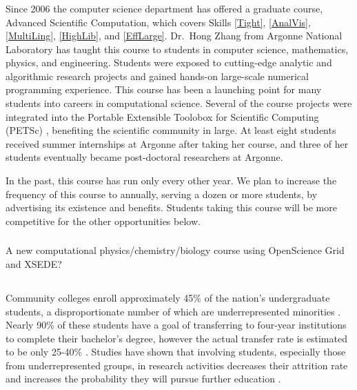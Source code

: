 \documentclass[11pt]{NSFamsart}
\begin{document}
\subsubsection{\LargeSCName} \label{LargeSC} Since 2006 the computer science department has offered a graduate course, Advanced Scientific Computation, which covers Skills \ref{Tight}, \ref{AnalVis}, \ref{MultiLing}, \ref{HighLib}, and \ref{EffLarge}.  Dr.\ Hong Zhang from Argonne National Laboratory has taught this course to students in computer science, mathematics, physics, and engineering. Students were exposed to cutting-edge analytic and algorithmic research projects and gained hands-on large-scale numerical programming experience. This course has been a launching point for many students into careers in computational science.  Several of the course projects were integrated into the Portable Extensible Toolobox for Scientific Computing (PETSc) \cite{petsc-web-page17}, benefiting the scientific community in large. At least eight students received summer internships at Argonne after taking her course, and three of her students eventually became post-doctoral researchers at Argonne.  

In the past, this course has run only every other year.  We plan to increase the frequency of this course to annually, serving a dozen or more students, by advertising its existence and benefits.  Students taking this course will be more competitive for the other opportunities below.

\subsubsection{\PhyChemBioCompSciName} \label{PhyChemBioCompSci} A new computational physics/chemistry/biology course using OpenScience Grid and XSEDE? 

\subsection{\CODSummerName} \label{CODSummer}
Community colleges enroll approximately 45\% of the nation's undergraduate students, a disproportionate number of which are underrepresented minorities \cite{KnappKG12,nsfreport13}.  Nearly 90\% of these students have a goal of transferring to four-year institutions to complete their bachelor's degree, however the actual transfer rate is estimated to be only 25-40\% \cite{HoachlanderSH03,MelguizoKA11}.  Studies have shown that involving students, especially those from underrepresented groups, in  research activities decreases  their attrition rate and increases the probability they will pursue further education \cite{BarlowV04,JonesBV10}.
\end{document}
